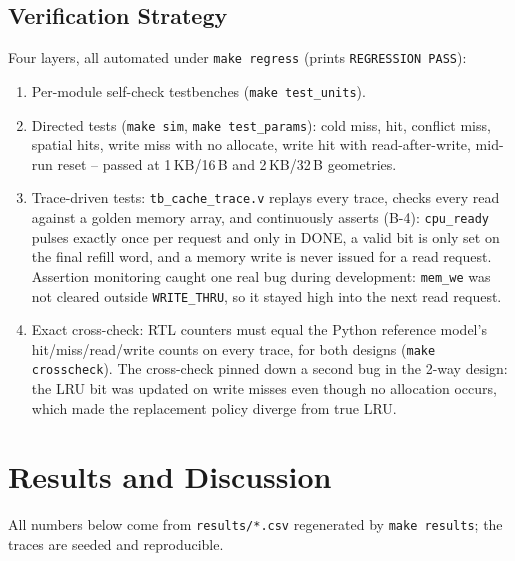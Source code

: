 \documentclass[conference]{IEEEtran}
\begin{document}
\subsection{Verification Strategy}
Four layers, all automated under \texttt{make regress} (prints
\texttt{REGRESSION PASS}):
\begin{enumerate}
  \item Per-module self-check testbenches (\texttt{make test\_units}).
  \item Directed tests (\texttt{make sim}, \texttt{make test\_params}):
        cold miss, hit, conflict miss, spatial hits, write miss with no
        allocate, write hit with read-after-write, mid-run reset -- passed at
        1\,KB/16\,B and 2\,KB/32\,B geometries.
  \item Trace-driven tests: \texttt{tb\_cache\_trace.v} replays every trace,
        checks every read against a golden memory array, and continuously
        asserts (B-4): \texttt{cpu\_ready} pulses exactly once per request and
        only in DONE, a valid bit is only set on the final refill word, and a
        memory write is never issued for a read request. Assertion monitoring
        caught one real bug during development: \texttt{mem\_we} was not
        cleared outside \texttt{WRITE\_THRU}, so it stayed high into the next
        read request.
  \item Exact cross-check: RTL counters must equal the Python reference
        model's hit/miss/read/write counts on every trace, for both designs
        (\texttt{make crosscheck}). The cross-check pinned down a second bug
        in the 2-way design: the LRU bit was updated on write misses even
        though no allocation occurs, which made the replacement policy
        diverge from true LRU.
\end{enumerate}

\section{Results and Discussion}
All numbers below come from \texttt{results/*.csv} regenerated by
\texttt{make results}; the traces are seeded and reproducible.
\end{document}

